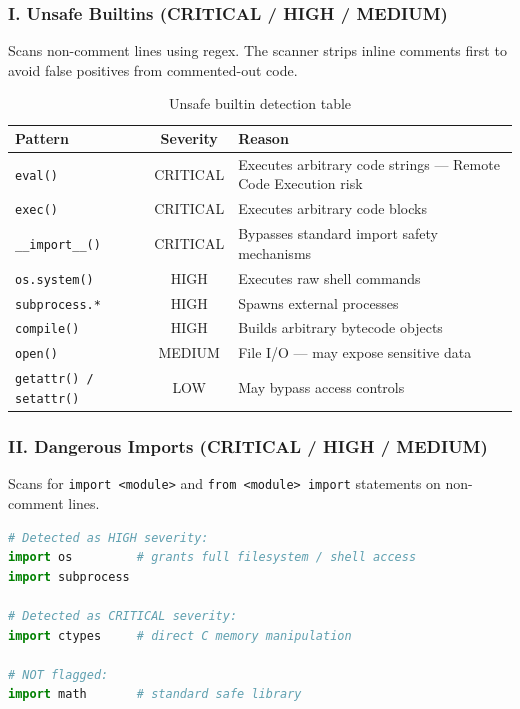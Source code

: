 \documentclass[a4paper,11pt]{article}
\begin{document}
\subsubsection{I. Unsafe Builtins (CRITICAL / HIGH / MEDIUM)}

Scans non-comment lines using regex. The scanner strips inline comments first to avoid false positives from commented-out code.

\begin{table}[h]
\centering
\begin{tabularx}{\textwidth}{|l|c|X|}
\hline
\rowcolor{red!10}
\textbf{Pattern} & \textbf{Severity} & \textbf{Reason} \\
\hline
\texttt{eval()} & CRITICAL & Executes arbitrary code strings — Remote Code Execution risk \\
\hline
\texttt{exec()} & CRITICAL & Executes arbitrary code blocks \\
\hline
\texttt{\_\_import\_\_()} & CRITICAL & Bypasses standard import safety mechanisms \\
\hline
\texttt{os.system()} & HIGH & Executes raw shell commands \\
\hline
\texttt{subprocess.*} & HIGH & Spawns external processes \\
\hline
\texttt{compile()} & HIGH & Builds arbitrary bytecode objects \\
\hline
\texttt{open()} & MEDIUM & File I/O — may expose sensitive data \\
\hline
\texttt{getattr() / setattr()} & LOW & May bypass access controls \\
\hline
\end{tabularx}
\caption{Unsafe builtin detection table}
\end{table}

\subsubsection{II. Dangerous Imports (CRITICAL / HIGH / MEDIUM)}

Scans for \texttt{import <module>} and \texttt{from <module> import} statements on non-comment lines.

\begin{lstlisting}[language=Python, caption=Dangerous import detection example]
# Detected as HIGH severity:
import os         # grants full filesystem / shell access
import subprocess

# Detected as CRITICAL severity:
import ctypes     # direct C memory manipulation

# NOT flagged:
import math       # standard safe library
\end{lstlisting}
\end{document}
